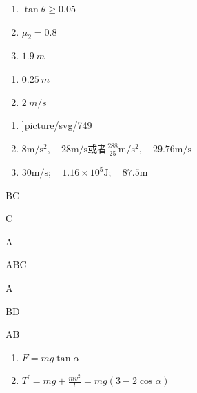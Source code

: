 \item \begin {enumerate} \renewcommand {\labelenumi }{\arabic {enumi}.} \item $\tan \theta \geq 0.05$ \item $\mu _ { 2 } = 0.8$ \item $ 1.9 \ m $ \par \par \par \end {enumerate} \par \par 
\item \begin {enumerate} \renewcommand {\labelenumi }{\arabic {enumi}.} \item $ 0.25 \ m $ \item $ 2 \ m/s $ \par \par \end {enumerate} \par \par 
\item \begin {enumerate} \renewcommand {\labelenumi }{\arabic {enumi}.} \item \linewidth ]{picture/svg/749} \item $8 \mathrm { m } / \mathrm { s } ^ { 2 } , \quad 28 \mathrm { m } / \mathrm { s }$或者$\frac { 288 } { 25 } \mathrm { m } / \mathrm { s } ^ { 2 } , \quad 29.76 \mathrm { m } / \mathrm { s }$ \item $30 \mathrm { m } / \mathrm { s } ; \quad 1.16 \times 10 ^ { 5 } \mathrm { J } ; \quad 87.5 \mathrm { m }$ \par \end {enumerate} \par \par 
\item BC
\item C
\item A
\item ABC
\item A
\item BD
\item AB
\item \begin {enumerate} \renewcommand {\labelenumi }{\arabic {enumi}.} \item $F = m g \tan \alpha $ \item $T ^ { \prime } = m g + \frac { m v ^ { 2 } } { l } = m g ( 3 - 2 \cos \alpha )$ \par \par \par \end {enumerate} \par \par 
